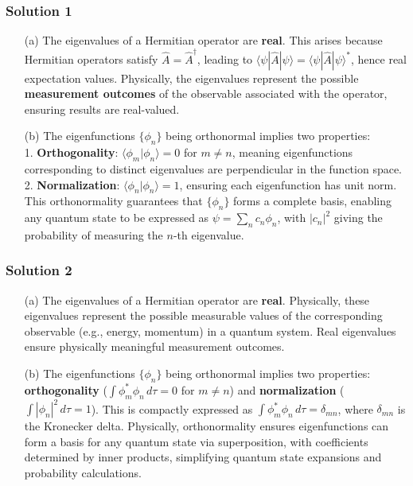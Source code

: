 \documentclass{article}
\begin{document}
\subsubsection{Solution 1}

\begin{enumerate}
    \item[(a)] The eigenvalues of a Hermitian operator are \textbf{real}. This arises because Hermitian operators satisfy \( \hat{A} = \hat{A}^\dagger \), leading to \( \langle \psi | \hat{A} | \psi \rangle = \langle \psi | \hat{A} | \psi \rangle^* \), hence real expectation values. Physically, the eigenvalues represent the possible \textbf{measurement outcomes} of the observable associated with the operator, ensuring results are real-valued.
    
    \item[(b)] The eigenfunctions \(\{\phi_n\}\) being orthonormal implies two properties: \\
    1. \textbf{Orthogonality}: \( \langle \phi_m | \phi_n \rangle = 0 \) for \( m \neq n \), meaning eigenfunctions corresponding to distinct eigenvalues are perpendicular in the function space. \\
    2. \textbf{Normalization}: \( \langle \phi_n | \phi_n \rangle = 1 \), ensuring each eigenfunction has unit norm. \\
    This orthonormality guarantees that \(\{\phi_n\}\) forms a complete basis, enabling any quantum state to be expressed as \( \psi = \sum_n c_n \phi_n \), with \( |c_n|^2 \) giving the probability of measuring the \(n\)-th eigenvalue.
\end{enumerate}

\subsubsection{Solution 2}

\begin{enumerate}
    \item[(a)] The eigenvalues of a Hermitian operator are \textbf{real}. Physically, these eigenvalues represent the possible measurable values of the corresponding observable (e.g., energy, momentum) in a quantum system. Real eigenvalues ensure physically meaningful measurement outcomes.

    \item[(b)] The eigenfunctions $\{\phi_n\}$ being orthonormal implies two properties: \textbf{orthogonality} ($\int \phi_m^* \phi_n \, d\tau = 0$ for $m \neq n$) and \textbf{normalization} ($\int |\phi_n|^2 \, d\tau = 1$). This is compactly expressed as $\int \phi_m^* \phi_n \, d\tau = \delta_{mn}$, where $\delta_{mn}$ is the Kronecker delta. Physically, orthonormality ensures eigenfunctions can form a basis for any quantum state via superposition, with coefficients determined by inner products, simplifying quantum state expansions and probability calculations.
\end{enumerate}
\end{document}
